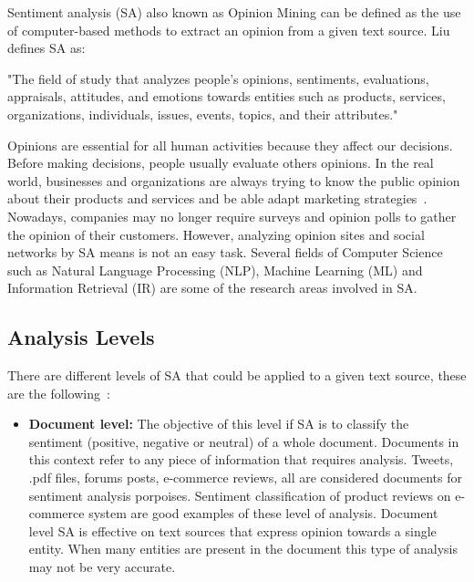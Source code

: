 { Sentiment analysis (SA) also known as Opinion Mining can be defined as the use of computer-based methods to extract an opinion from a given text source. Liu ~\cite[p. 7]{liu2012sentiment} defines SA as: 
 \begin{displayquote}
"The field of study that 
analyzes people’s opinions, sentiments, evaluations, appraisals, attitudes, 
and emotions towards entities such as products, services, organizations, 
individuals, issues, events, topics, and 
their attributes."
\end{displayquote}
    
Opinions are essential for all human activities because they affect our decisions. Before making decisions, people usually evaluate others opinions. In the real world, businesses and organizations are always trying to know the public opinion about their
products and services and be able adapt marketing strategies~\cite[p. 10]{liu2012sentiment}. Nowadays, companies may no longer require surveys and opinion polls to gather the opinion of their customers. However, analyzing opinion sites and social networks by SA means is not an easy task. Several fields of Computer Science such as Natural Language Processing (NLP), Machine Learning (ML) and Information Retrieval (IR) are some of the research areas involved in SA. 

\subsection{Analysis Levels}

There are different levels of SA that could be applied to a given text source, these are the following~\cite[p. 11]{liu2012sentiment}:
 
\begin{itemize}

\item \textbf{Document level:} The objective of this level if SA is to classify the sentiment (positive, negative or neutral) of a whole document. Documents in this context refer to any piece of information that requires analysis. Tweets, .pdf files, forums posts, e-commerce reviews, all are considered documents for sentiment analysis porpoises. Sentiment classification of product reviews on e-commerce system are good examples of these level of analysis. Document level SA is effective on text sources that express opinion towards a single entity. When many entities are present in the document this type of analysis may not be very accurate.


\end{itemize}}
